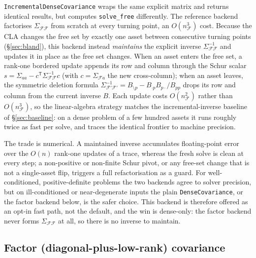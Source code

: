 \documentclass[11pt]{article}
\newcommand{\Sig}{\Sigma}
\newcommand{\F}{\mathcal{F}}        %
\newcommand{\trans}{^{\mathsf{T}}}
\newcommand{\inv}{^{-1}}
\begin{document}
\texttt{IncrementalDenseCovariance} wraps the same explicit matrix and returns
identical results, but computes \texttt{solve\_free} differently. The reference
backend factorises $\Sig_{\F\F}$ from scratch at every turning point, an
$O(n_\F^3)$ cost. Because the CLA changes the free set by exactly one asset
between consecutive turning points (\S\ref{sec:bland}), this backend instead
\emph{maintains} the explicit inverse $\Sig_{\F\F}\inv$ and updates it in place as
the free set changes. When an asset enters the free set, a rank-one bordered
update appends its row and column through the Schur scalar
$s = \Sig_{aa} - c\trans \Sig_{\F\F}\inv c$ (with $c = \Sig_{\F a}$ the new
cross-column); when an asset leaves, the symmetric deletion formula
$\Sig_{\F'\F'}\inv = B_{\setminus p} - B_{\cdot p}B_{p\cdot}/B_{pp}$ drops its row
and column from the current inverse $B$. Each update costs $O(n_\F^2)$ rather than
$O(n_\F^3)$, so the linear-algebra strategy matches the incremental-inverse
baseline of \S\ref{sec:baseline}: on a dense problem of a few hundred assets it
runs roughly twice as fast per solve, and traces the identical frontier to machine
precision.

The trade is numerical. A maintained inverse accumulates floating-point error over
the $O(n)$ rank-one updates of a trace, whereas the fresh solve is clean at every
step; a non-positive or non-finite Schur pivot, or any free-set change that is not
a single-asset flip, triggers a full refactorisation as a guard. For
well-conditioned, positive-definite problems the two backends agree to solver
precision, but on ill-conditioned or near-degenerate inputs the plain
\texttt{DenseCovariance}, or the factor backend below, is the safer choice.
This backend is therefore offered as an opt-in fast path, not the default, and the
win is dense-only: the factor backend never forms $\Sig_{\F\F}$ at all, so there is
no inverse to maintain.

\subsection{Factor (diagonal-plus-low-rank) covariance}
\end{document}
